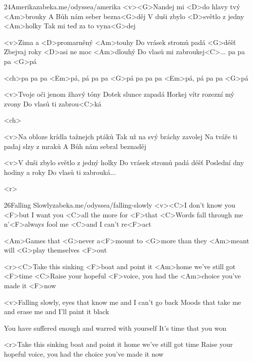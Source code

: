 \begin{song}[Lucie]{24}{Amerika}{zabeka.me/odyssea/amerika}
	<v><G>Nandej mi <D>do hlavy tvý <Am>brouky
	A Bůh nám seber bezna<G>děj
	V duši zbylo <D>světlo z jedny <Am>holky
	Tak mi teď za to vyna<G>dej

	<v>Zima a <D>promarněný <Am>touhy
	Do vrásek stromů padá <G>déšť
	Zbejvaj roky <D>asi ne moc <Am>dlouhý
	Do vlasů mi zabroukej<C>... pa pa pa <G>pá

	<ch>pa pa pa <Em>pá, pá pa pa <G>pá
	pa pa pa <Em>pá, pá pa pa <G>pá

	<v>Tvoje oči jenom žhavý tóny
	Dotek slunce zapadá
	Horkej vítr rozezní mý zvony
	Do vlasů ti zabrou<C>ká

	<ch>

	<v>Na obloze krídla tažnejch ptáků
	Tak už na svý bráchy zavolej
	Na tváře ti padaj slzy z mraků
	A Bůh nám sebral beznaděj

	<v>V duši zbylo světlo z jedný holky
	Do vrásek stromů padá déšť
	Poslední dny hodiny a roky
	Do vlasů ti zabrouká...

	<r>
\end{song}
\begin{song}{26}{Falling Slowly}{zabeka.me/odyssea/falling-slowly}
	<v><C>I don't know you <F>but I want you
	<C>all the more for <F>that
	<C>Words fall through me n'<F>always fool me
	<C>and I can't re<F>act

	<Am>Games that <G>never a<F>mount
	to <G>more than they <Am>meant
	will <G>play themselves <F>out

	<r><C>Take this sinking <F>boat and point it <Am>home
	we've still got <F>time
	<C>Raise your hopeful <F>voice, you had the <Am>choice
	you've made it <F>now

	<v>Falling slowly, eyes that know me
	and I can't go back
	Moods that take me and erase me
	and I'll paint it black

	You have suffered enough
	and warred with yourself
	It's time that you won

	<r>Take this sinking boat and point it home
	we've still got time
	Raise your hopeful voice, you had the choice
	you've made it now

\end{song}

